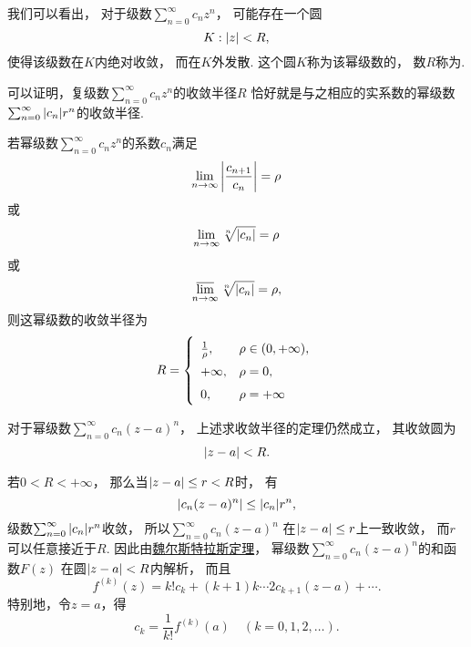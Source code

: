 我们可以看出，
对于级数\(\sum_{n=0}^\infty c_n z^n\)，
可能存在一个圆\[
	K: \abs{z} < R,
\]使得该级数在\(K\)内绝对收敛，
而在\(K\)外发散.
这个圆\(K\)称为该幂级数的，
数\(R\)称为.

可以证明，复级数\(\sum_{n=0}^\infty c_n z^n\)的收敛半径\(R\)
恰好就是与之相应的实系数的幂级数\(\sum_{n=0}^\infty \abs{c_n} r^n\)的收敛半径.

\begin{theorem}\label{theorem:解析函数的级数表示.复幂级数的收敛半径的求法}
若幂级数\(\sum_{n=0}^\infty c_n z^n\)的系数\(c_n\)满足\[
	\lim_{n\to\infty} \abs{\frac{c_{n+1}}{c_n}} = \rho
\]或\[
	\lim_{n\to\infty} \sqrt[n]{\abs{c_n}} = \rho
\]或\[
	\varlimsup_{n\to\infty} \sqrt[n]{\abs{c_n}} = \rho,
\]
则这幂级数的收敛半径为\[
	\def\arraystretch{1.5}
	R = \left\{ \begin{array}{ll}
		\frac{1}{\rho}, & \rho \in (0,+\infty), \\
		+\infty, & \rho = 0, \\
		0, & \rho = +\infty \\
	\end{array} \right.
\]
\end{theorem}
对于幂级数\(\sum_{n=0}^\infty c_n (z-a)^n\)，
上述求收敛半径的定理仍然成立，
其收敛圆为\[
	\abs{z-a}<R.
\]

若\(0<R<+\infty\)，
那么当\(\abs{z-a} \leq r < R\)时，
有\[
	\abs{c_n (z-a)^n} \leq \abs{c_n} r^n,
\]
级数\(\sum_{n=0}^\infty \abs{c_n} r^n\)收敛，
所以\(\sum_{n=0}^\infty c_n (z-a)^n\)
在\(\abs{z-a} \leq r\)上一致收敛，
而\(r\)可以任意接近于\(R\).
因此由\hyperref[theorem:解析函数的级数表示.魏尔斯特拉斯定理]{魏尔斯特拉斯定理}，
幂级数\(\sum_{n=0}^\infty c_n (z-a)^n\)的和函数\(F(z)\)
在圆\(\abs{z-a}<R\)内解析，
而且\[
	f^{(k)}(z) = k! c_k + (k+1)k\dotsm2c_{k+1}(z-a)+\dotsb.
\]
特别地，令\(z=a\)，得\[
	c_k = \frac{1}{k!} f^{(k)}(a)
	\quad(k=0,1,2,\dotsc).
\]

